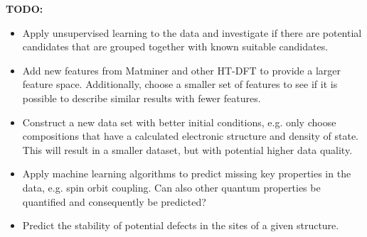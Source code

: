 \textbf{TODO:}
\begin{itemize}
  \item Apply unsupervised learning to the data and investigate if there are potential candidates that are grouped together with known suitable candidates.
  \item Add new features from Matminer and other HT-DFT to provide a larger feature space. Additionally, choose a smaller set of features to see if it is possible to describe similar results with fewer features.
  \item Construct a new data set with better initial conditions, e.g. only choose compositions that have a calculated electronic structure and density of state. This will result in a smaller dataset, but with potential higher data quality.
  \item Apply machine learning algorithms to predict missing key properties in the data, e.g. spin orbit coupling. Can also other  quantum properties be quantified and consequently be predicted?
  \item Predict the stability of potential defects in the sites of a given structure.
\end{itemize}


